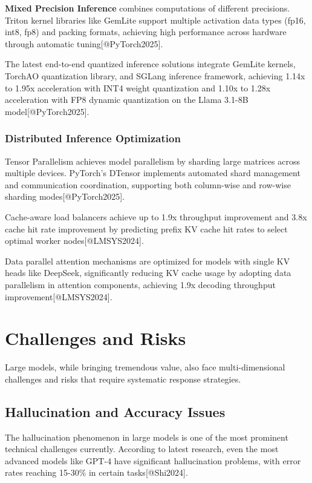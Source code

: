 \documentclass{article}
\begin{document}
\textbf{Mixed Precision Inference} combines computations of different precisions. Triton kernel libraries like GemLite support multiple activation data types (fp16, int8, fp8) and packing formats, achieving high performance across hardware through automatic tuning[@PyTorch2025].

The latest end-to-end quantized inference solutions integrate GemLite kernels, TorchAO quantization library, and SGLang inference framework, achieving 1.14x to 1.95x acceleration with INT4 weight quantization and 1.10x to 1.28x acceleration with FP8 dynamic quantization on the Llama 3.1-8B model[@PyTorch2025].

\subsubsection{Distributed Inference Optimization}
Tensor Parallelism achieves model parallelism by sharding large matrices across multiple devices. PyTorch's DTensor implements automated shard management and communication coordination, supporting both column-wise and row-wise sharding modes[@PyTorch2025].

Cache-aware load balancers achieve up to 1.9x throughput improvement and 3.8x cache hit rate improvement by predicting prefix KV cache hit rates to select optimal worker nodes[@LMSYS2024].

Data parallel attention mechanisms are optimized for models with single KV heads like DeepSeek, significantly reducing KV cache usage by adopting data parallelism in attention components, achieving 1.9x decoding throughput improvement[@LMSYS2024]. 

\section{Challenges and Risks}
Large models, while bringing tremendous value, also face multi-dimensional challenges and risks that require systematic response strategies.

\subsection{Hallucination and Accuracy Issues}
The hallucination phenomenon in large models is one of the most prominent technical challenges currently. According to latest research, even the most advanced models like GPT-4 have significant hallucination problems, with error rates reaching 15-30\% in certain tasks[@Shi2024].
\end{document}
